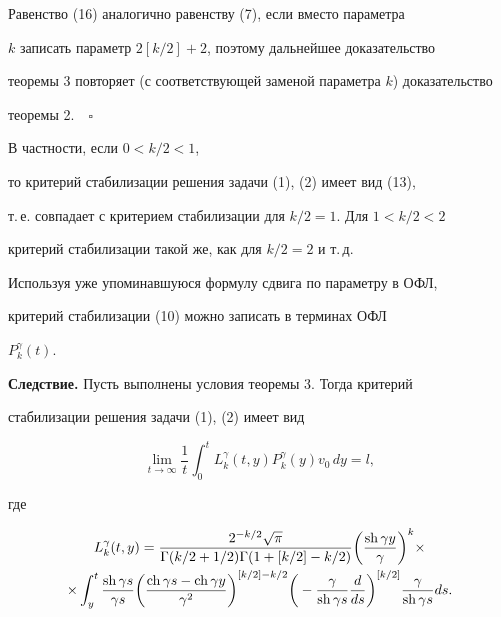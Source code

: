Равенство (16) аналогично равенству (7), если вместо параметра


$k$ записать параметр $2[k/2]+2$, поэтому дальнейшее доказательство


теоремы 3 повторяет (с соответствующей заменой параметра $k$) доказательство


теоремы 2.$\quad\square$


\medskip





В частности, если $0<k/2<1$,


то критерий стабилизации решения задачи (1), (2) имеет вид (13),


т.\,е. совпадает с критерием стабилизации для $k/2=1$. Для $1<k/2<2$


критерий стабилизации такой же, как для $k/2=2$ и т.\,д.





Используя уже упоминавшуюся формулу сдвига по параметру в ОФЛ,


критерий стабилизации (10) можно записать в терминах ОФЛ


$P_k^\gamma(t)$.


\medskip





{\bf Следствие.} Пусть выполнены условия теоремы 3. Тогда критерий


стабилизации решения задачи (1), (2) имеет вид


$$


\lim_{t\to\infty} \frac{1}{t}


\int_0^t L_k^\gamma(t,y)P_k^\gamma(y)v_0\, dy=l,


$$


где


\begin{multline*}


L_k^\gamma(t,y)=


\frac{2^{-k/2}\sqrt{\pi}}{\Gamma(k/2+1/2)\Gamma(1+[k/2]-k/2)}


\bigg(\frac{\sh \gamma y}{\gamma}\bigg )^k \times\\


%


\times \int_y^t \frac{\sh \gamma s}{\gamma s}


\bigg(\frac{\ch \gamma s-\ch \gamma y}{\gamma^2}\bigg)^{[k/2]-k/2}


\bigg(-\frac{\gamma}{\sh \gamma s} \frac{d}{ds}\bigg )^{[k/2]}


\frac{\gamma}{\sh \gamma s} ds.


\end{multline*}





